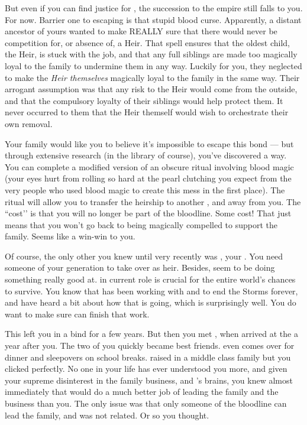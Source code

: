 \documentclass[char]{GL2020}
\begin{document}
But even if you can find justice for \cHeirSibling{}, the succession to the \cHeir{\formal} empire still falls to you. For now. Barrier one to escaping is that stupid blood curse. Apparently, a distant ancestor of yours wanted to make REALLY sure that there would never be competition for, or absence of, a \cHeir{\formal} Heir. That spell ensures that the oldest child, the Heir, is stuck with the job, and that any full siblings are made too magically loyal to the family to undermine them in any way. Luckily for you, they neglected to make the \emph{Heir themselves} magically loyal to the family in the same way. Their arrogant assumption was that any risk to the Heir would come from the outside, and that the compulsory loyalty of their siblings would help protect them. It never occurred to them that the Heir themself would wish to orchestrate their own removal. 

Your family would like you to believe it's impossible to escape this bond — but through extensive research (in the library of course), you've discovered a way. You can complete a modified version of an obscure ritual involving blood magic (your eyes hurt from rolling so hard at the pearl clutching you expect from the very people who used blood magic to create this mess in the first place). The ritual will allow you to transfer the heirship to another \cHeir{\formal}, and away from you. The ``cost’’ is that you will no longer be part of the bloodline. Some cost! That just means that you won’t go back to being magically compelled to support the family. Seems like a win-win to you.

Of course, the only other \cHeir{\formal} you knew until very recently was \cDiplomat{\full}, your \cDiplomat{\auncle}. You need someone of your generation to take over as heir.  Besides,\cDiplomat{\they} seem\cDiplomat{\verbs} to be doing something \cDiplomat{\theyare} really good at. \cDiplomat{} in \cDiplomat{\their} current role is crucial for the entire world’s chances to survive. You know that \cDiplomat{} has been working with \cHeadScientist{\full} and \cAssistantScientist{\full} to end the Storms forever, and have heard a bit about how that is going, which is surprisingly well. You do want to make sure \cDiplomat{} can finish that work.

This left you in a bind for a few years. But then you met \cAmbition{}, when \cAmbition{\they} arrived at the \pSc{} a year after you. The two of you quickly became best friends. \cAmbition{} even comes over for dinner and sleepovers on school breaks. \cAmbition{\Theywere} raised in a middle class family but you clicked perfectly. No one in your life has ever understood you more, and given your supreme disinterest in the family business, and \cAmbition{}’s brains, you knew almost immediately that \cAmbition{\they} would do a much better job of leading the family and the business than you. The only issue was that only someone of the \cHeir{\formal} bloodline can lead the family, and \cAmbition{} was not related. Or so you thought.  
\end{document}
